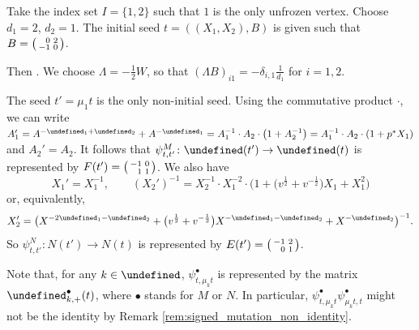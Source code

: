 \documentclass[10pt,a4paper]{amsart}
\newcommand{\opname}[1]{\operatorname{\mathsf{#1}}}
\newcommand{\ufv}{\opname{uf}}
\let\Mc\undefined
\let\Iufv\undefined
\let\trans\undefined
\let\ee\undefined
\let\ff\undefined
\newcommand{\Mc}{M^\circ}
\newcommand{\Iufv}{I_{\ufv}}
\newcommand{\trans}{\opname{P}}
\newcommand{\ee}{\mathbf{e}}
\newcommand{\ff}{\mathbf{f}}
\numberwithin{equation}{section}
\begin{document}
\begin{Example}\label{eg:A_1_eg}
Take the index set $I=\{1,2\}$ such that $1$ is the only unfrozen
vertex. Choose $d_{1}=2$, $d_{2}=1$. The initial seed $t=((X_{1},X_{2}),B)$
is given such that $B=\left(\begin{smallmatrix}
\hphantom{-}0 & 2\\
-1 & 0
\end{smallmatrix}\right)$.

Then . We choose $\Lambda=-\frac{1}{2}W$, so that $(\Lambda B)_{i1}=-\delta_{i,1}\frac{1}{d_1}$ for $i=1,2$.

The seed $t'=\mu_{1}t$ is the only non-initial seed. Using the commutative product $\cdot$, we can write $A_{1}'=A^{-\ff_1+\ff_2}+A^{-\ff_1}=A_{1}^{-1}\cdot A_{2}\cdot \big(1+A_{2}^{-1}\big)=A_{1}^{-1}\cdot A_{2}\cdot (1+p^{*}X_{1})$
and $A_{2}'=A_{2}.$ It follows that $\psi_{t,t'}^{M}\colon \Mc(t')\rightarrow\Mc(t)$
is represented by $F(t')=\left(\begin{smallmatrix}
-1 & 0\\
\hphantom{-}1 & 1
\end{smallmatrix}\right)$. We also have \[X_{1}'=X_{1}^{-1}, \qquad (X_{2}')^{-1}=X_{2}^{-1}\cdot X_{1}^{-2}\cdot \big(1+\big(v^{\frac{1}{2}}+v^{-\frac{1}{2}}\big)X_1+X_{1}^2\big)\] or, equivalently, \[X_2'=\big(X^{-2\ee_1-\ee_2}+\big(v^{\frac{1}{2}}+v^{-\frac{1}{2}}\big)X^{-\ee_1-\ee_2}+X^{-\ee_2}\big)^{-1}.\]
So $\psi_{t,t'}^{N}\colon N(t')\rightarrow N(t)$ is represented by $E(t')=\left(\begin{smallmatrix}
-1 & 2\\
\hphantom{-}0 & 1
\end{smallmatrix}\right)$.

\end{Example}

Note that, for any $k\in\Iufv$, $\psi_{t,\mu_{k}t}^{\bullet}$ is
represented by the matrix $\trans_{k,+}^{\bullet}(t)$, where $\bullet$
stands for $M$ or $N$. In particular, $\psi_{t,\mu_{k}t}^{\bullet}\psi_{\mu_{k}t,t}^{\bullet}$
might not be the identity by Remark \ref{rem:signed_mutation_non_identity}.
\end{document}
